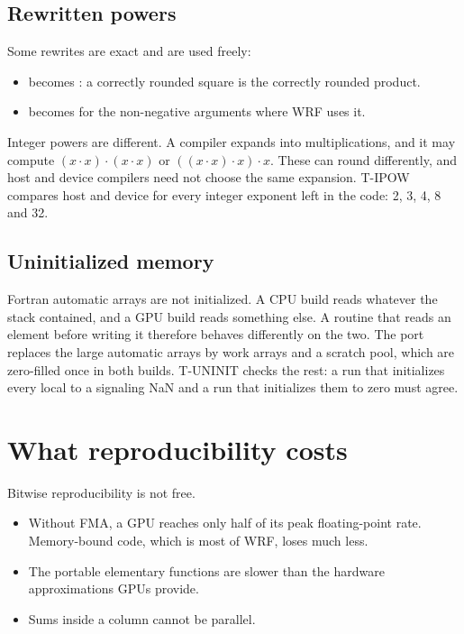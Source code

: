 \subsection{Rewritten powers}

Some rewrites are exact and are used freely:
\begin{itemize}
  \item {} becomes : a correctly rounded square is the correctly rounded product.
  \item {} becomes  for the non-negative arguments where WRF uses it.
\end{itemize}

Integer powers are different. A compiler expands  into multiplications, and it may compute
$(x\cdot x)\cdot(x\cdot x)$ or $((x\cdot x)\cdot x)\cdot x$. These can round differently, and host and device
compilers need not choose the same expansion. T-IPOW compares host and device for every integer exponent left in the
code: 2, 3, 4, 8 and 32.

\subsection{Uninitialized memory}

Fortran automatic arrays are not initialized. A CPU build reads whatever the stack contained, and a GPU build reads
something else. A routine that reads an element before writing it therefore behaves differently on the two. The port
replaces the large automatic arrays by work arrays and a scratch pool, which are zero-filled once in both builds.
T-UNINIT checks the rest: a run that initializes every local to a signaling NaN and a run that initializes them to
zero must agree.

\section{What reproducibility costs}

Bitwise reproducibility is not free.
\begin{itemize}
  \item Without FMA, a GPU reaches only half of its peak floating-point rate. Memory-bound code, which is most of
    WRF, loses much less.
  \item The portable elementary functions are slower than the hardware approximations GPUs provide.
  \item Sums inside a column cannot be parallel.
\end{itemize}

